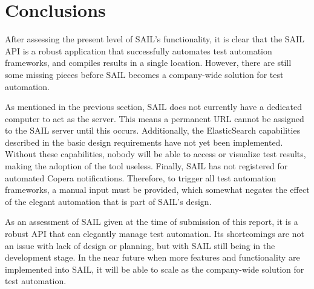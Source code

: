 \documentclass[10pt, titlepage, onecolumn, openany]{article}
\begin{document}
\section{Conclusions}
After assessing the present level of SAIL's functionality, it is clear that the
SAIL API is a robust application that successfully automates test automation
frameworks, and compiles results in a single location. However, there are still
some missing pieces before SAIL becomes a company-wide solution for test automation.

As mentioned in the previous section, SAIL does not currently have a dedicated
computer to act as the server. This means a permanent URL cannot be assigned to
the SAIL server until this occurs. Additionally, the ElasticSearch capabilities
described in the basic design requirements have not yet been implemented. Without
these capabilities, nobody will be able to access or visualize test results, making
the adoption of the tool useless. Finally, SAIL has not registered for automated
Copera notifications. Therefore, to trigger all test automation frameworks,
a manual input must be provided, which somewhat negates the effect of the elegant
automation that is part of SAIL's design.

As an assessment of SAIL given at the time of submission of this report, it is
a robust API that can elegantly manage test automation. Its shortcomings are not
an issue with lack of design or planning, but with SAIL still being in the development
stage. In the near future when more features and functionality are implemented
into SAIL, it will be able to scale as the company-wide solution for test automation.
\clearpage
\end{document}
